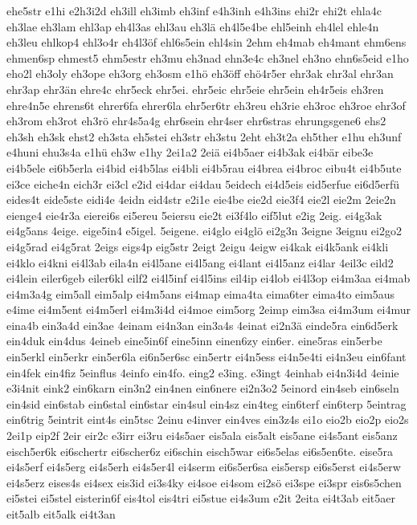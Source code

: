 {ehe5str
e1hi
e2h3i2d
eh3ill
eh3imb
eh3inf
e4h3inh
e4h3ins
ehi2r
ehi2t
ehla4c
eh3lae
eh3lam
ehl3ap
eh4l3as
ehl3au
eh3lä
eh4l5e4be
ehl5einh
eh4lel
ehle4n
eh3leu
ehlkop4
ehl3o4r
eh4l3öf
ehl6s5ein
ehl4sin
2ehm
eh4mab
eh4mant
ehm6ens
ehmen6sp
ehmest5
ehm5estr
eh3mu
eh3nad
ehn3e4c
eh3nel
eh3no
ehn6s5eid
e1ho
eho2l
eh3oly
eh3ope
eh3org
eh3osm
e1hö
eh3öff
ehö4r5er
ehr3ak
ehr3al
ehr3an
ehr3ap
ehr3än
ehre4c
ehr5eck
ehr5ei.
ehr5eic
ehr5eie
ehr5ein
eh4r5eis
eh3ren
ehre4n5e
ehrens6t
ehrer6fa
ehrer6la
ehr5er6tr
eh3reu
eh3rie
eh3roc
eh3roe
ehr3of
eh3rom
eh3rot
eh3rö
ehr4s5a4g
ehr6sein
ehr4ser
ehr6stras
ehrungsgene6
ehs2
eh3sh
eh3sk
ehst2
eh3sta
eh5stei
eh3str
eh3stu
2eht
eh3t2a
eh5ther
e1hu
eh3unf
e4huni
ehu3s4a
e1hü
eh3w
e1hy
2ei1a2
2eiä
ei4b5aer
ei4b3ak
ei4bär
eibe3e
ei4b5ele
ei6b5erla
ei4bid
ei4b5las
ei4bli
ei4b5rau
ei4brea
ei4broc
eibu4t
ei4b5ute
ei3ce
eiche4n
eich3r
ei3cl
e2id
ei4dar
ei4dau
5eidech
ei4d5eis
eid5erfue
ei6d5erfü
eides4t
eide5ste
eidi4e
4eidn
eid4str
e2i1e
eie4be
eie2d
eie3f4
eie2l
eie2m
2eie2n
eienge4
eie4r3a
eierei6s
ei5ereu
5eiersu
eie2t
ei3f4lo
eif5lut
e2ig
2eig.
ei4g3ak
ei4g5ans
4eige.
eige5in4
e5igel.
5eigene.
ei4glo
ei4glö
ei2g3n
3eigne
3eignu
ei2go2
ei4g5rad
ei4g5rat
2eigs
eigs4p
eig5str
2eigt
2eigu
4eigw
ei4kak
ei4k5ank
ei4kli
ei4klo
ei4kni
ei4l3ab
eila4n
ei4l5ane
ei4l5ang
ei4lant
ei4l5anz
ei4lar
4eil3c
eild2
ei4lein
eiler6geb
eiler6kl
eilf2
ei4l5inf
ei4l5ins
eil4ip
ei4lob
ei4l3op
ei4m3aa
ei4mab
ei4m3a4g
eim5all
eim5alp
ei4m5ans
ei4map
eima4ta
eima6ter
eima4to
eim5aus
e4ime
ei4m5ent
ei4m5erl
ei4m3i4d
ei4moe
eim5org
2eimp
eim3sa
ei4m3um
ei4mur
eina4b
ein3a4d
ein3ae
4einam
ei4n3an
ein3a4s
4einat
ei2n3ä
einde5ra
ein6d5erk
ein4duk
ein4dus
4eineb
eine5in6f
eine5inn
einen6zy
ein6er.
eine5ras
ein5erbe
ein5erkl
ein5erkr
ein5er6la
ei6n5er6sc
ein5ertr
ei4n5ess
ei4n5e4ti
ei4n3eu
ein6fant
ein4fek
ein4fiz
5einflus
4einfo
ein4fo.
eing2
e3ing.
e3ingt
4einhab
ei4n3i4d
4einie
e3i4nit
eink2
ein6karn
ein3n2
ein4nen
ein6nere
ei2n3o2
5einord
ein4seb
ein6seln
ein4sid
ein6stab
ein6stal
ein6star
ein4sul
ein4sz
ein4teg
ein6terf
ein6terp
5eintrag
ein6trig
5eintrit
eint4s
ein5tsc
2einu
e4inver
ein4ves
ein3z4s
ei1o
eio2b
eio2p
eio2s
2ei1p
eip2f
2eir
eir2c
e3irr
ei3ru
ei4s5aer
eis5ala
eis5alt
eis5ane
ei4s5ant
eis5anz
eisch5er6k
ei6schertr
ei6scher6z
ei6schin
eisch5war
ei6s5elas
ei6s5en6te.
eise5ra
ei4s5erf
ei4s5erg
ei4s5erh
ei4s5er4l
ei4serm
ei6s5er6sa
eis5ersp
ei6s5erst
ei4s5erw
ei4s5erz
eises4s
ei4sex
eis3id
ei3s4ky
ei4soe
ei4som
ei2sö
ei3spe
ei3spr
eis6s5chen
ei5stei
ei5stel
eisterin6f
eis4tol
eis4tri
ei5stue
ei4s3um
e2it
2eita
ei4t3ab
eit5aer
eit5alb
eit5alk
ei4t3an
}
